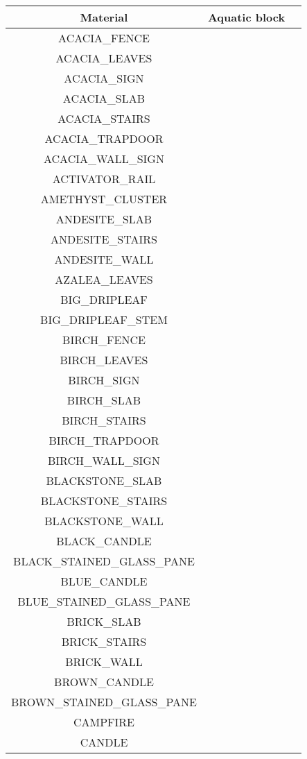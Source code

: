 \documentclass[11pt]{article}
\newcommand{\xmark}{\ding{55}}%
\begin{document}
\begin{longtable}{ |c|c|c| }
	\hline
	Material & Aquatic block\footnotemark \\
	\hline
	\endhead
	ACACIA\_FENCE & \xmark \\
	ACACIA\_LEAVES & \xmark \\
	ACACIA\_SIGN & \xmark \\
	ACACIA\_SLAB & \xmark \\
	ACACIA\_STAIRS & \xmark \\
	ACACIA\_TRAPDOOR & \xmark \\
	ACACIA\_WALL\_SIGN & \xmark \\
	ACTIVATOR\_RAIL & \xmark \\
	AMETHYST\_CLUSTER & \xmark \\
	ANDESITE\_SLAB & \xmark \\
	ANDESITE\_STAIRS & \xmark \\
	ANDESITE\_WALL & \xmark \\
	AZALEA\_LEAVES & \xmark \\
	BIG\_DRIPLEAF & \xmark \\
	BIG\_DRIPLEAF\_STEM & \xmark \\
	BIRCH\_FENCE & \xmark \\
	BIRCH\_LEAVES & \xmark \\
	BIRCH\_SIGN & \xmark \\
	BIRCH\_SLAB & \xmark \\
	BIRCH\_STAIRS & \xmark \\
	BIRCH\_TRAPDOOR & \xmark \\
	BIRCH\_WALL\_SIGN & \xmark \\
	BLACKSTONE\_SLAB & \xmark \\
	BLACKSTONE\_STAIRS & \xmark \\
	BLACKSTONE\_WALL & \xmark \\
	BLACK\_CANDLE & \xmark \\
	BLACK\_STAINED\_GLASS\_PANE & \xmark \\
	BLUE\_CANDLE & \xmark \\
	BLUE\_STAINED\_GLASS\_PANE & \xmark \\
	BRICK\_SLAB & \xmark \\
	BRICK\_STAIRS & \xmark \\
	BRICK\_WALL & \xmark \\
	BROWN\_CANDLE & \xmark \\
	BROWN\_STAINED\_GLASS\_PANE & \xmark \\
	CAMPFIRE & \xmark \\
	CANDLE & \xmark \\

\end{longtable}
\end{document}

